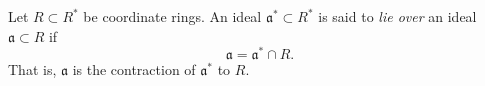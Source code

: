 Let $R \subset R^*$ be coordinate rings. An ideal $\mathfrak{a}^* \subset R^*$ is said to \textit{lie over} an ideal $\mathfrak{a} \subset R$ if
$$\mathfrak{a} = \mathfrak{a}^* \cap R.$$
That is, $\mathfrak{a}$ is the contraction of $\mathfrak{a}^*$ to $R$.

